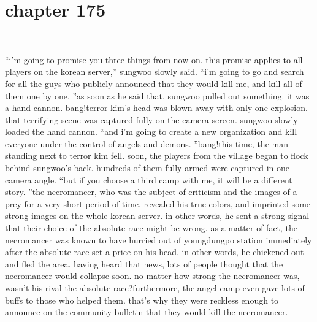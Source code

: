 \section{chapter 175}

                             




“i’m going to promise you three things from now on.
 this promise applies to all players on the korean server,” sungwoo slowly said.
 “i’m going to go and search for all the guys who publicly announced that they would kill me, and kill all of them one by one.
”as soon as he said that, sungwoo pulled out something.
 it was a hand cannon.
bang!terror kim’s head was blown away with only one explosion.
 that terrifying scene was captured fully on the camera screen.
 sungwoo slowly loaded the hand cannon.
“and i’m going to create a new organization and kill everyone under the control of angels and demons.
”bang!this time, the man standing next to terror kim fell.
 soon, the players from the village began to flock behind sungwoo’s back.
 hundreds of them fully armed were captured in one camera angle.
“but if you choose a third camp with me, it will be a different story.
”the necromancer, who was the subject of criticism and the images of a prey for a very short period of time, revealed his true colors, and imprinted some strong images on the whole korean server.
 in other words, he sent a strong signal that their choice of the absolute race might be wrong.
as a matter of fact, the necromancer was known to have hurried out of youngdungpo station immediately after the absolute race set a price on his head.
 in other words, he chickened out and fled the area.
having heard that news, lots of people thought that the necromancer would collapse soon.
 no matter how strong the necromancer was, wasn’t his rival the absolute race?furthermore, the angel camp even gave lots of buffs to those who helped them.
 that’s why they were reckless enough to announce on the community bulletin that they would kill the necromancer.

